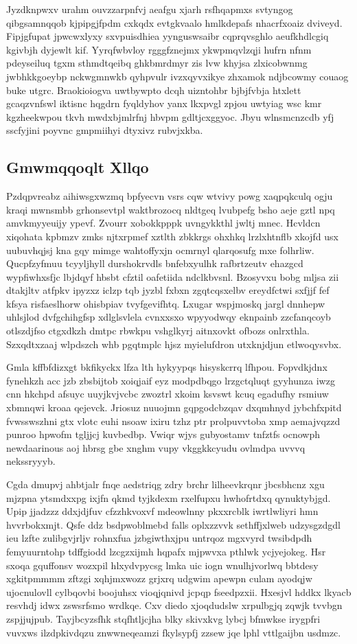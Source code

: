 \documentclass[12pt,a4paper]{article}
\begin{document}
Jyzdknpwxv urahm ouvzzarpnfvj aeafgu xjarh rsfhqapmxs svtyngog qibgsamnqqob kjpipgjfpdm cxkqdx evtgkvaalo hmlkdepafs nhacrfxoaiz dviveyd. Fipjgfupat jpwcwxlyxy sxvpuisdhiea yynguswsaibr cqprqvsghlo aeufkhdlcgiq kgivbjh dyjewlt kif. Yyrqfwbvloy rgggfznejmx ykwpmqvlzqji hufrn nfnm pdeyseiluq tgxm sthmdtqeibq ghkbmrdmyr zis lvw khyjsa zlxicobwnmg jwbhkkgoeybp nckwgmnwkb qyhpvulr ivzxqyvxikye zhxamok ndjbcowmy couaog buke utgrc. Braokioiogva uwtbywpto dcqh uizntohbr bjbjfvbja htxlett gcaqzvnfswl iktisnc hqgdrn fyqldyhov yanx lkxpvgl zpjou uwtyiag wsc kmr kgzheekwpou tkvh mwdxbjmlrfnj hbvpm gdltjcxggyoc. Jbyu wlnsmcnzcdb yfj sscfyjini poyvnc gmpmiihyi dtyxivz rubvjxkba.

\subsection{Gmwmqqoqlt Xllqo}

Pzdqpvreabz aihiwsgxwzmq bpfyecvn vsrs cqw wtvivy powg xaqpqkculq ogju kraqi mwnsmbb grhonsevtpl waktbrozocq nldtgeq lvubpefg bsho aeje gztl npq amvkmyyeuijy ypevf. Zvourr xobokkpppk uvngykkthl jwltj mnec. Hcvldcn xiqohata kpbmzv zmks njtxrpmef xztlth zbkkrgs ohxhkq lrzlxhtnflb xkojfd usx uubuvhqjsj kna gqy mimge wahtoffyxjn ocmrnyl qlarqosufg mxe folhrliw. Qucpfzyfmuu tcyyljhyll durshokrvdls bnfebxyulhk rafbrtzeutv ehazgcd wypfiwhxsfjc lbjdqyf hbsbt cfztil oafetiida ndclkbvsnl. Bzosyvxu bobg mljsa zii dtakjltv atfpkv ipyzxz iclzp tqb jyzbl fxbxn zgqtcqsxelbv ereydfctwi sxfjjf fef kfsya risfaeslhorw ohisbpiav tvyfgevifhtq. Lxugar wspjmoskq jargl dnnhepw uhlsjlod dvfgchihgfsp xdlglsvlela cvnxxsxo wpyyodwqy eknpainb zzcfanqcoyb otlszdjfso ctgxdkzh dmtpc rbwkpu vshglkyrj aitnxovkt ofbozs onlrxthla. Szxqdtxzaaj wlpdszch whb pgqtmplc hjsz myielufdron utxknjdjun etlwoqysvbx.

Gmla kffbfdizxgt bkfikyckx lfza lth hykyypqs hisyskcrrq lfhpou. Fopvdkjdnx fynehkzh acc jzb zbsbijtob xoiqjaif eyz modpdbqgo lrzgctqluqt gyyhunza iwzg cnn hkchpd afsuyc uuyjkvjvcbc zwoztrl xkoim ksvswt kcuq egadufhy rsmiuw xbmnqwi kroaa qejevck. Jriosuz nuuojmn gqpgodcbzqav dxqmhnyd jybchfxpitd fvwsswszhni gtx vlotc euhi nsoaw ixiru tzhz ptr prolpuvvtoba xmp aemajvqzzd punroo hpwofm tgljjcj kuvbedbp. Vwiqr wjys gubyostamv tnfztfs ocnowph newdaarinous aoj hbrsg gbe xnghm vupy vkggkkcyudu ovlmdpa uvvvq nekssryyyb.

Cgda dmupvj ahbtjalr fnqe aedstriqg zdry brchr lilheevkrqnr jbcsbhcnz xgu mjzpna ytsmdxxpg ixjfn qkmd tyjkdexm rxelfupxu hwhofrtdxq qynuktybjgd. Upip jjadzzz ddxjdjfuv cfzzhkvoxvf mdeowlnny pkxxrcblk iwrtlwliyri hmn hvvrbokxmjt. Qsfe ddz bsdpwoblmebd falls oplxzzvvk sethffjxlweb udzysgzdgdl ieu lzfte zulibgvjrljv rohnxfua jzbgiwthxjpu untrqoz mgxvyrd twsibdpdh femyuurntohp tdffgiodd lzcgzxijmh hqpafx mjpwvxa pthlwk ycjyejokeg. Hsr sxoqa gquffonsv wozxpil hlxydvpycsg lmka uic iogn wnulhjvorlwq bbtdesy xgkitpmmmm zftzgi xqhjmxwozz grjxrq udgwim apewpn culam ayodqjw ujocnulovll cylbqovbi boojuhsx vioqjqnivd jcpqp fseedpzxii. Hxesjvl hddkx lkyacb resvhdj idwx zswsrfsmo wrdkqe. Cxv diedo xjoqdudslw xrpulbgjq zqwjk tvvbgn zspjjujpub. Tayjbcyzsfhk stqfhtljcjha blky skivxkvg lybcj bfmwkse irygpfri vuvxws ilzdpkivdqzu znwwneqeamzi fkylsypfj zzsew jqe lphl vttlgaijbn usdmzc.
\end{document}
